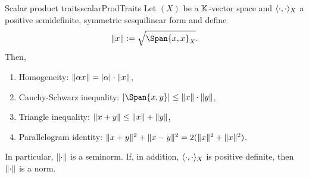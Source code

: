 \documentclass[language=english]{../../Template/TemplateLecture}
\begin{document}
\begin{lem}{Scalar product traits}{scalarProdTraits}
    Let $(X)$ be a $\mathbb{K}$-vector space and $\langle\cdot,\cdot\rangle_X$ a positive semidefinite, symmetric sesquilinear form and define 
    \begin{equation}
        \norm{x} := \sqrt{\Span{x,x}_X}.
    \end{equation}
    Then,
    \begin{enumerate}[$(i)$]
        \item Homogeneity: $\lVert\alpha x\rVert = \lvert\alpha\rvert \cdot \lVert x\rVert$,
        \item Cauchy-Schwarz inequality: $\abs{\Span{x,y}} \leq \norm{x} \cdot \norm{y}$,
        \item Triangle inequality: $\lVert x + y\rVert\leq \lVert x\rVert + \lVert y\rVert$,
        \item Parallelogram identity: $\lVert x + y\rVert^2 + \lVert x-y\rVert^2 = 2(\lVert x\rVert^2 + \lVert x\rVert^2)$.
    \end{enumerate}
    In particular, $\lVert\cdot\rVert$ is a seminorm. If, in addition, $\langle\cdot,\cdot\rangle_X$ is positive definite, then $\lVert\cdot\rVert$ is a norm.
\end{lem}
\end{document}
